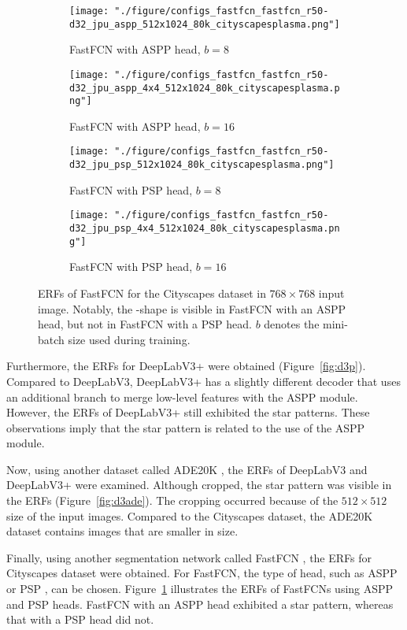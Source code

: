 \documentclass{article}
\def\figref#1{Figure~\ref{#1}}
\begin{document}
\begin{figure}[t!]
	\centering
	\begin{subfigure}[b]{0.241\linewidth}
		\centering
		\texttt{[image: "./figure/configs\_fastfcn\_fastfcn\_r50-d32\_jpu\_aspp\_512x1024\_80k\_cityscapesplasma.png"]}
		\caption{FastFCN with ASPP head, $b=8$}
	\end{subfigure}
	\hfill
	\begin{subfigure}[b]{0.241\linewidth}
		\centering
		\texttt{[image: "./figure/configs\_fastfcn\_fastfcn\_r50-d32\_jpu\_aspp\_4x4\_512x1024\_80k\_cityscapesplasma.png"]}
		\caption{FastFCN with ASPP head, $b=16$}
	\end{subfigure}
	\hfill
	\begin{subfigure}[b]{0.241\linewidth}
		\centering
		\texttt{[image: "./figure/configs\_fastfcn\_fastfcn\_r50-d32\_jpu\_psp\_512x1024\_80k\_cityscapesplasma.png"]}
		\caption{FastFCN with PSP head, $b=8$}
	\end{subfigure}
	\hfill
	\begin{subfigure}[b]{0.241\linewidth}
		\centering
		\texttt{[image: "./figure/configs\_fastfcn\_fastfcn\_r50-d32\_jpu\_psp\_4x4\_512x1024\_80k\_cityscapesplasma.png"]}
		\caption{FastFCN with PSP head, $b=16$}
	\end{subfigure}
	\caption{ERFs of FastFCN for the Cityscapes dataset in $768 \times 768$ input image. Notably, the \EightStarTaper-shape is visible in FastFCN with an ASPP head, but not in FastFCN with a PSP head. $b$ denotes the mini-batch size used during training.}
	\label{fig:fastfcn}
\end{figure}


Furthermore, the ERFs for DeepLabV3+ were obtained (\figref{fig:d3p}). Compared to DeepLabV3, DeepLabV3+ has a slightly different decoder that uses an additional branch to merge low-level features with the ASPP module. However, the ERFs of DeepLabV3+ still exhibited the star patterns. These observations imply that the star pattern is related to the use of the ASPP module.

Now, using another dataset called ADE20K \citep{DBLP:journals/ijcv/ZhouZPXFBT19}, the ERFs of DeepLabV3 and DeepLabV3+ were examined. Although cropped, the star pattern was visible in the ERFs (\figref{fig:d3ade}). The cropping occurred because of the $512 \times 512$ size of the input images. Compared to the Cityscapes dataset, the ADE20K dataset contains images that are smaller in size.

Finally, using another segmentation network called FastFCN \citep{DBLP:journals/corr/abs-1903-11816}, the ERFs for Cityscapes dataset were obtained. For FastFCN, the type of head, such as ASPP or PSP \citep{DBLP:conf/cvpr/ZhaoSQWJ17}, can be chosen. \figref{fig:fastfcn} illustrates the ERFs of FastFCNs using ASPP and PSP heads. FastFCN with an ASPP head exhibited a star pattern, whereas that with a PSP head did not.
\end{document}
